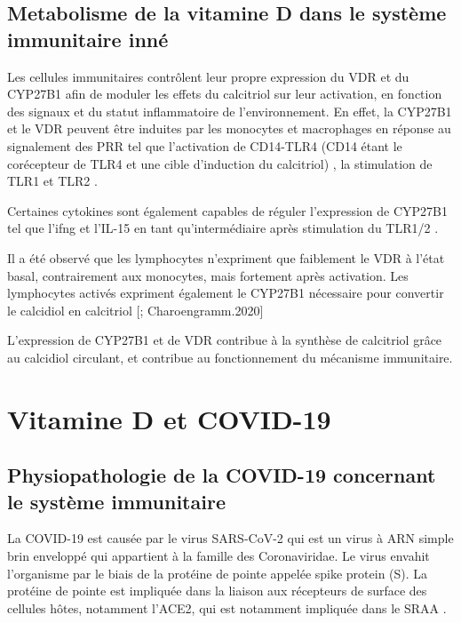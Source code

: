 \documentclass[
  a4paper,
  DIV=11,
  numbers=noendperiod,
  listof=totoc]{scrreprt}
\begin{document}
\section{Metabolisme de la vitamine D dans le système immunitaire
inné}\label{metabolisme-de-la-vitamine-d-dans-le-systuxe8me-immunitaire-innuxe9}

Les cellules immunitaires contrôlent leur propre expression du \ac{VDR}
et du \ac{CYP27B1} afin de moduler les effets du calcitriol sur leur
activation, en fonction des signaux et du statut inflammatoire de
l'environnement. En effet, la \ac{CYP27B1} et le \ac{VDR} peuvent être
induites par les monocytes et macrophages en réponse au signalement des
\ac{PRR} tel que l'activation de CD14-TLR4 (CD14 étant le corécepteur de
TLR4 et une cible d'induction du calcitriol) \autocite{Stoffels.2009},
la stimulation de TLR1 et TLR2 \autocite{Liu.2006}.

Certaines cytokines sont également capables de réguler l'expression de
\ac{CYP27B1} tel que l'\ac{ifng} \autocite{Stoffels.2009} et l'IL-15 en
tant qu'intermédiaire après stimulation du TLR1/2
\autocite{Krutzik.2008}.

Il a été observé que les lymphocytes n'expriment que faiblement le
\ac{VDR} à l'état basal, contrairement aux monocytes, mais fortement
après activation. Les lymphocytes activés expriment également le
\ac{CYP27B1} nécessaire pour convertir le calcidiol en calcitriol
{[}\textcite{Bishop.2021}; Charoengramm.2020{]}

L'expression de \ac{CYP27B1} et de \ac{VDR} contribue à la synthèse de
calcitriol grâce au calcidiol circulant, et contribue au fonctionnement
du mécanisme immunitaire.

\newpage{}

\chapter{Vitamine D et COVID-19}\label{vitamine-d-et-covid-19}

\section{Physiopathologie de la COVID-19 concernant le système
immunitaire}\label{physiopathologie-de-la-covid-19-concernant-le-systuxe8me-immunitaire}

La \ac{COVID-19} est causée par le virus \ac{SARS-CoV-2} qui est un
virus à ARN simple brin enveloppé qui appartient à la famille des
Coronaviridae. Le virus envahit l'organisme par le biais de la protéine
de pointe appelée spike protein (S). La protéine de pointe est impliquée
dans la liaison aux récepteurs de surface des cellules hôtes, notamment
l'\ac{ACE2}, qui est notamment impliquée dans le \ac{SRAA}
\autocite{Marik.2021}.
\end{document}

